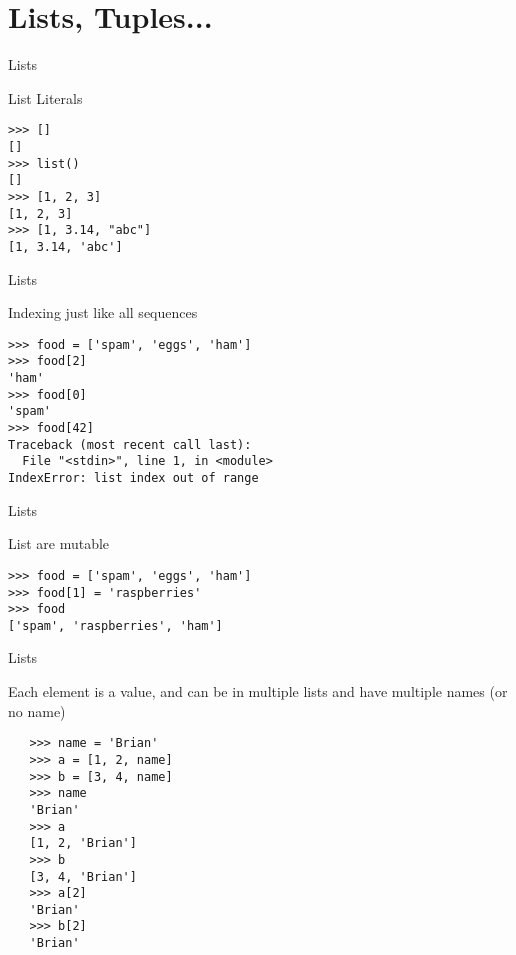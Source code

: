 \documentclass{beamer}
\begin{document}
\section{Lists, Tuples...}

\begin{frame}[fragile]{Lists}

 {\Large List Literals}

\begin{verbatim}
>>> []
[]
>>> list()
[]
>>> [1, 2, 3]
[1, 2, 3]
>>> [1, 3.14, "abc"]
[1, 3.14, 'abc']
\end{verbatim}

\end{frame} 

\begin{frame}[fragile]{Lists}

 {\Large Indexing just like all sequences}

\begin{verbatim}
>>> food = ['spam', 'eggs', 'ham']
>>> food[2]
'ham'
>>> food[0]
'spam'
>>> food[42]
Traceback (most recent call last):
  File "<stdin>", line 1, in <module>
IndexError: list index out of range
\end{verbatim}

\end{frame} 

\begin{frame}[fragile]{Lists}

{\Large List are mutable}

\begin{verbatim}
>>> food = ['spam', 'eggs', 'ham']
>>> food[1] = 'raspberries'
>>> food
['spam', 'raspberries', 'ham']
\end{verbatim}

\end{frame} 

\begin{frame}[fragile]{Lists}

{\Large Each element is a value, and can be in multiple lists and have multiple
names (or no name)}

\begin{verbatim}
￼  >>> name = 'Brian'
   >>> a = [1, 2, name]
   >>> b = [3, 4, name]
   >>> name
   'Brian'
   >>> a
   [1, 2, 'Brian']
   >>> b
   [3, 4, 'Brian']
   >>> a[2]
   'Brian'
   >>> b[2]
   'Brian'
\end{verbatim}

\end{frame} 
\end{document}
